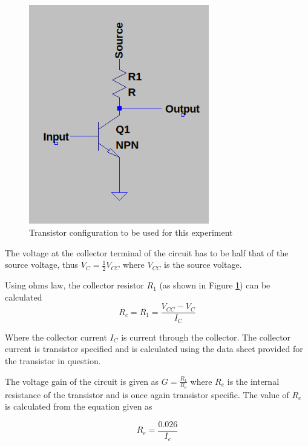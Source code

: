 \documentclass[12pt, a4paper]{article}
\begin{document}
	 \begin{figure}[H]
	 	\centering
		\label{fig:transistor_configuration_circuit}
		\includegraphics[width=0.7\textwidth]{images/transistor_configuration_circuit.png}
		\caption{Transistor configuration to be used for this experiment}
	 \end{figure}

 	The voltage at the collector terminal of the circuit has to be half that of the source voltage, thus $V_C = \frac{1}{2}V_{CC}$ where $V_{CC}$ is the source voltage.

 	Using ohms law, the collector resistor $R_1$ (as shown in Figure \ref{fig:transistor_configuration_circuit}) can be calculated
 	\begin{equation}
 		R_c = R_1 = \frac{V_{CC}-V_C}{I_C}
 	\end{equation}

 	Where the collector current $I_C$ is current through the collector. The collector current is transistor specified and is calculated using the data sheet provided for the transistor in question. 

 	The voltage gain of the circuit is given as $G = \frac{R_1}{R_e}$ where $R_e$ is the internal resistance of the transistor and is once again transistor specific. The value of $R_e$ is calculated from the equation given as 

 	\begin{equation}
 		R_e = \frac{0.026}{I_e}
 	\end{equation}
\end{document}

